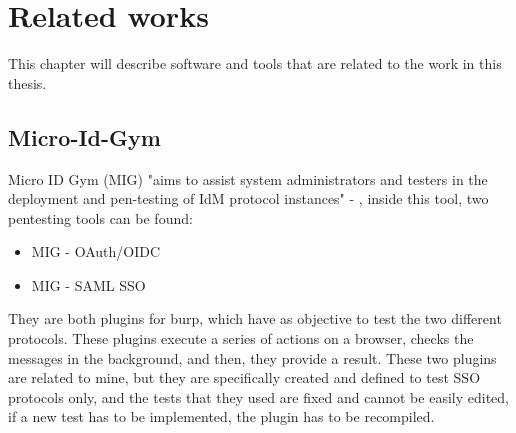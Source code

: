 \chapter{Related works}
\label{chap:Related_work}
This chapter will describe software and tools that are related to the work in this thesis.

\section{Micro-Id-Gym}
\label{sec:micro-id-gym}
Micro ID Gym (MIG) "aims to assist system administrators and testers in the deployment and pen-testing of IdM protocol instances" - \cite{micro_id_gym}, inside this tool, two pentesting tools can be found:
\begin{itemize}
    \item MIG - OAuth/OIDC \cite{claudio_grisenti}
    \item MIG - SAML SSO \cite{stefano_facchini}
\end{itemize}
They are both plugins for \Gls{burp}, which have as objective to test the two different protocols. These plugins execute a series of actions on a browser, checks the messages in the background, and then, they provide a result.
These two plugins are related to mine, but they are specifically created and defined to test SSO protocols only, and the tests that they used are fixed and cannot be easily edited, if a new test has to be implemented, the plugin has to be recompiled.

